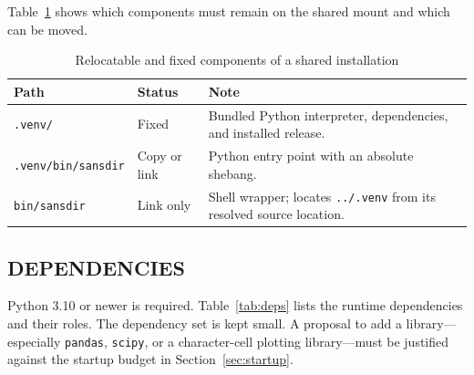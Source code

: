 \documentclass[tm]{ornltm}
\begin{document}
Table~\ref{tab:portable} shows which components must remain on the shared mount
and which can be moved.

\begin{table}[ht]
  \centering
  \caption{Relocatable and fixed components of a shared installation}
  \label{tab:portable}
  \small
  \begin{tabular}{p{} p{} p{}}
    \toprule
    Path & Status & Note \\
    \midrule
    \texttt{.venv/} & Fixed & Bundled Python interpreter, dependencies, and
      installed release. \\
    \texttt{.venv/bin/sansdir} & Copy or link & Python entry point with an
      absolute shebang. \\
    \texttt{bin/sansdir} & Link only & Shell wrapper; locates
      \texttt{../.venv} from its resolved source location. \\
    \bottomrule
  \end{tabular}
\end{table}

\subsection{DEPENDENCIES}

Python 3.10 or newer is required. Table~\ref{tab:deps} lists the runtime
dependencies and their roles. The dependency set is kept small. A proposal to
add a library---especially \texttt{pandas}, \texttt{scipy}, or a character-cell
plotting library---must be justified against the startup budget in
Section~\ref{sec:startup}.
\end{document}
